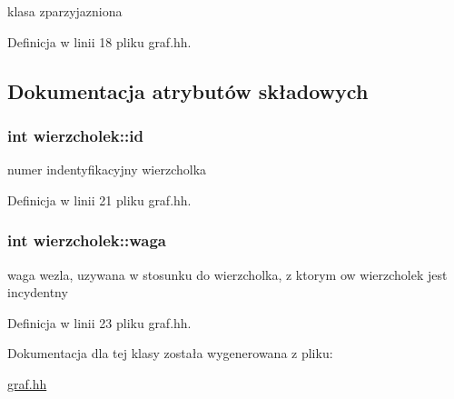 klasa zparzyjazniona 



\-Definicja w linii 18 pliku graf.\-hh.



\subsection{\-Dokumentacja atrybutów składowych}
\hypertarget{classwierzcholek_ada68383887e4523b766e2c1e5ab6fa6e}{
\subsubsection[{id}]{\setlength{\rightskip}{0pt plus 5cm}int {\bf wierzcholek\-::id}}}\label{classwierzcholek_ada68383887e4523b766e2c1e5ab6fa6e}


numer indentyfikacyjny wierzcholka 



\-Definicja w linii 21 pliku graf.\-hh.

\hypertarget{classwierzcholek_a3c53d7c09f6e83be8808bd78d6221e08}{
\subsubsection[{waga}]{\setlength{\rightskip}{0pt plus 5cm}int {\bf wierzcholek\-::waga}}}\label{classwierzcholek_a3c53d7c09f6e83be8808bd78d6221e08}


waga wezla, uzywana w stosunku do wierzcholka, z ktorym ow wierzcholek jest incydentny 



\-Definicja w linii 23 pliku graf.\-hh.



\-Dokumentacja dla tej klasy została wygenerowana z pliku\-:\begin{DoxyCompactItemize}
\item 
\hyperlink{graf_8hh}{graf.\-hh}\end{DoxyCompactItemize}
